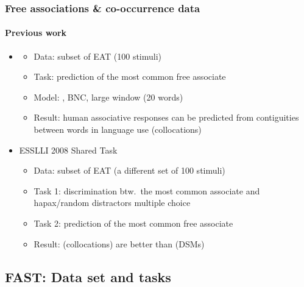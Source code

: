 \documentclass[t]{beamer} %
\begin{document}
\begin{frame}
  \frametitle{Free associations \& co-occurrence data}
  \framesubtitle{Previous work}

  \begin{itemize}
  \item \citet{Wettler:Rapp:Sedlmeier:05}
    \begin{itemize} 
    \item Data: subset of EAT (100 stimuli)
    \item Task: prediction of the most common free associate 
    \item Model: , BNC, large window (20 words)
    \item Result: human associative responses can be predicted from contiguities between words in language use (collocations)
    \end{itemize}
    \gap
  \item ESSLLI 2008 Shared Task
    \begin{itemize} 
    \item Data: subset of EAT (a different set of 100 stimuli)
    \item Task 1: discrimination btw.\ the most common associate and hapax/random distractors \so multiple choice
    \item Task 2: prediction of the most common free associate
    \item Result:  (collocations) are better than  (DSMs)
    \end{itemize}
  \end{itemize}
\end{frame}

\subsection{FAST: Data set and tasks}
\end{document}
